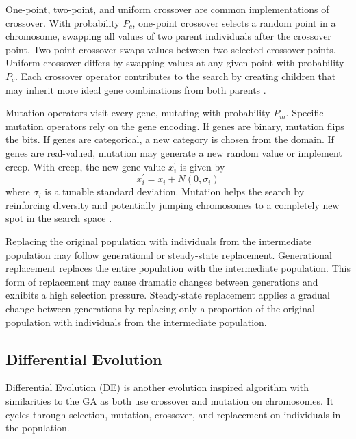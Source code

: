 \documentclass[twoside,11pt]{article}
\begin{document}
	One-point, two-point, and uniform crossover are common implementations of crossover. 
	With probability $P_c$, one-point crossover selects a random point in a chromosome, swapping all values of two parent individuals after the crossover point. 
	Two-point crossover swaps values between two selected crossover points. 
	Uniform crossover differs by swapping values at any given point with probability $P_c$. 
	Each crossover operator contributes to the search by creating children that may inherit more ideal gene combinations from both parents \citep{ga_tutorial}.


	Mutation operators visit every gene, mutating with probability $P_m$. 
	Specific mutation operators rely on the gene encoding. 
	If genes are binary, mutation flips the bits. 
	If genes are categorical, a new category is chosen from the domain. 
	If genes are real-valued, mutation may generate a new random value or implement creep. With creep, the new gene value $x_i^\prime$ is given by
	$$x_i^\prime = x_i + N(0, \sigma_i)$$
	where $\sigma_i$ is a tunable standard deviation. 
	Mutation helps the search by reinforcing diversity and potentially jumping chromosomes to a completely new spot in the search space \citep{ga_tutorial}.

	Replacing the original population with individuals from the intermediate population may follow generational or steady-state replacement. 
	Generational replacement replaces the entire population with the intermediate population. 
	This form of replacement may cause dramatic changes between generations and exhibits a high selection pressure. 
	Steady-state replacement applies a gradual change between generations by replacing only a proportion of the original population with individuals from the intermediate population.

\subsection{Differential Evolution}
	
	Differential Evolution (DE) is another evolution inspired algorithm with similarities to the GA as both use crossover and mutation on chromosomes. 
	It cycles through selection, mutation, crossover, and replacement on individuals in the population.
	
\end{document}
